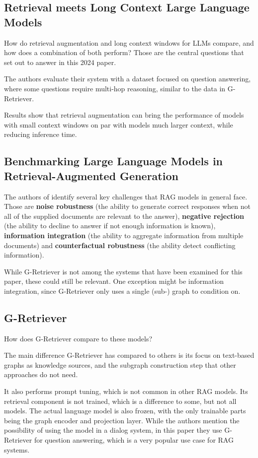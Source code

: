 \subsection{Retrieval meets Long Context Large Language Models}

How do retrieval augmentation and long context windows for LLMs compare, and how does a combination of both perform?
Those are the central questions that \citet{Xu2023RetrievalML} set out to answer in this 2024 paper.

The authors evaluate their system with a dataset focused on question answering, where some questions require multi-hop reasoning, similar to the data in G-Retriever.

Results show that retrieval augmentation can bring the performance of models with small context windows on par with models much larger context, while reducing inference time.

\subsection{Benchmarking Large Language Models in Retrieval-Augmented Generation}

The authors of \citet{benchmarking} identify several key challenges that RAG models in general face. Those are \textbf{noise robustness} (the ability to generate correct responses when not all of the supplied documents are relevant to the answer), \textbf{negative rejection} (the ability to decline to answer if not enough information is known), \textbf{information integration} (the ability to aggregate information from multiple documents) and \textbf{counterfactual robustness} (the ability detect conflicting information).

While G-Retriever is not among the systems that have been examined for this paper, these could still be relevant.
One exception might be information integration, since G-Retriever only uses a single (sub-) graph to condition on.



\subsection{G-Retriever}

How does G-Retriever compare to these models?

The main difference G-Retriever has compared to others is its focus on text-based graphs as knowledge sources, and the subgraph construction step that other approaches do not need.

It also performs prompt tuning, which is not common in other RAG models. Its retrieval component is not trained, which is a difference to some, but not all models. The actual language model is also frozen, with the only trainable parts being the graph encoder and projection layer.
While the authors mention the possibility of using the model in a dialog system, in this paper they use G-Retriever for question answering, which is a very popular use case for RAG systems.
